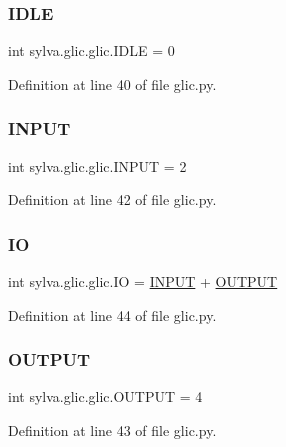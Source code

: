 \subsubsection{\texorpdfstring{I\+D\+LE}{IDLE}}
{\footnotesize\ttfamily int sylva.\+glic.\+glic.\+I\+D\+LE = 0}



Definition at line 40 of file glic.\+py.

\mbox{\label{namespacesylva_1_1glic_1_1glic_ab7e66a35c60e9c2fbeb69191240a7dc9}} 
\subsubsection{\texorpdfstring{I\+N\+P\+UT}{INPUT}}
{\footnotesize\ttfamily int sylva.\+glic.\+glic.\+I\+N\+P\+UT = 2}



Definition at line 42 of file glic.\+py.

\mbox{\label{namespacesylva_1_1glic_1_1glic_a9c96f3856c9e68f1b545a0f7ee5b68fa}} 
\subsubsection{\texorpdfstring{IO}{IO}}
{\footnotesize\ttfamily int sylva.\+glic.\+glic.\+IO = \hyperlink{namespacesylva_1_1glic_1_1glic_ab7e66a35c60e9c2fbeb69191240a7dc9}{I\+N\+P\+UT} + \hyperlink{namespacesylva_1_1glic_1_1glic_ad6e11d2ff626d576dddd38f99952a31a}{O\+U\+T\+P\+UT}}



Definition at line 44 of file glic.\+py.

\mbox{\label{namespacesylva_1_1glic_1_1glic_ad6e11d2ff626d576dddd38f99952a31a}} 
\subsubsection{\texorpdfstring{O\+U\+T\+P\+UT}{OUTPUT}}
{\footnotesize\ttfamily int sylva.\+glic.\+glic.\+O\+U\+T\+P\+UT = 4}



Definition at line 43 of file glic.\+py.

